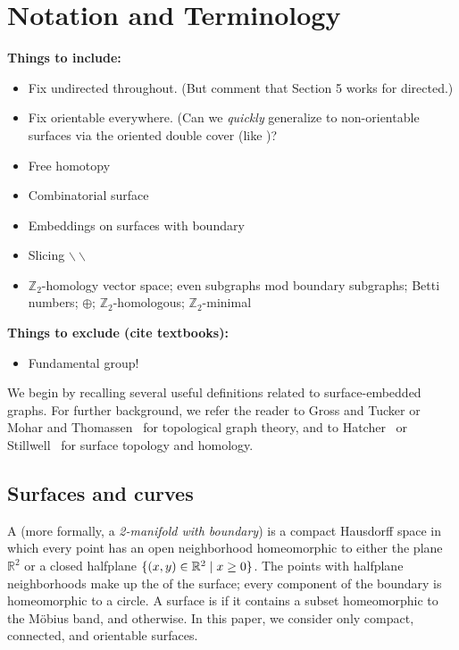 \documentclass[11pt,twoside]{article}
\def\Z{\mathbb{Z}}
\def\Real{\mathbb{R}}
\def\snip{\mathbin{\raisebox{0.15ex}{\rotatebox[origin=c]{60}{\Rightscissors}\!}}}
\def\snip{\mathbin{\backslash\!\!\backslash}}
\begin{document}
\section{Notation and Terminology}
\label{sec:prelims}


\begin{TODO}
\noindent
\textbf{Things to include:}
\begin{itemize}\cramped
\item Fix undirected throughout.  (But comment that Section 5 works for directed.)
\item Fix orientable everywhere.  (Can we \emph{quickly} generalize to non-orientable surfaces via the oriented double cover (like \cite{cen-hfcc-12})?
\item Free homotopy
\item Combinatorial surface
\item Embeddings on surfaces with boundary
\item Slicing $\snip$
\item $\Z_2$-homology vector space; even subgraphs mod boundary subgraphs; Betti numbers; $\oplus$; $\Z_2$-homologous; $\Z_2$-minimal
\end{itemize}
\noindent
\textbf{Things to exclude (cite textbooks):}
\begin{itemize}\cramped
\item Fundamental group!
\end{itemize}
\end{TODO}



We begin by recalling several useful definitions related to surface-embedded graphs.  For further background, we refer the reader to Gross and Tucker \cite{gt-tgt-01} or Mohar and Thomassen~\cite{mt-gs-01} for topological graph theory, and to Hatcher~\cite{h-at-02} or Stillwell~\cite{s-ctcgt-93} for surface topology and homology.


\subsection{Surfaces and curves}
\label{SS:surfaces}

A  (more formally, a \emph{2-manifold with boundary}) is a compact Hausdorff space in which every point has an open neighborhood homeomorphic to either the plane $\Real^2$ or a closed halfplane $\set{(x,y)\in \Real^2\mid x\ge 0}$.  The points with halfplane neighborhoods make up the  of the surface; every component of the boundary is homeomorphic to a circle.
A surface is  if it contains a subset homeomorphic to
the M\"obius band, and  otherwise. In this paper, we consider only compact, connected, and orientable surfaces.
\end{document}
